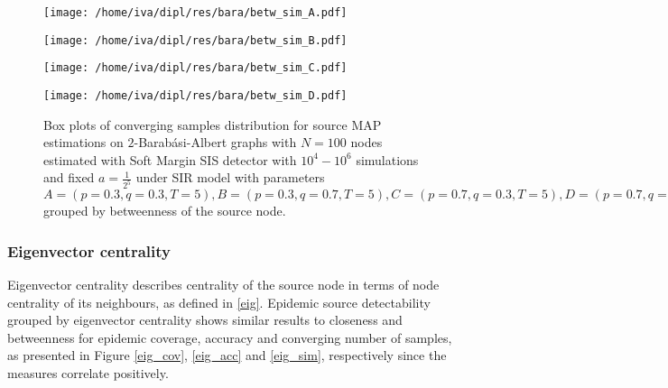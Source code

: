 \documentclass[times, utf8, diplomski]{fer}
\begin{document}
\begin{figure}[H]
\begin{minipage}{\textwidth}
\begin{minipage}{0.5\textwidth}
\texttt{[image: /home/iva/dipl/res/bara/betw\_sim\_A.pdf]}
\end{minipage}
\begin{minipage}{0.5\textwidth}
\texttt{[image: /home/iva/dipl/res/bara/betw\_sim\_B.pdf]}
\end{minipage}
\begin{minipage}{0.5\textwidth}
\texttt{[image: /home/iva/dipl/res/bara/betw\_sim\_C.pdf]}
\end{minipage}
\begin{minipage}{0.5\textwidth}
\texttt{[image: /home/iva/dipl/res/bara/betw\_sim\_D.pdf]}
\end{minipage}
\caption{Box plots of converging samples distribution for source MAP estimations on  $2$-Barab\'{a}si-Albert graphs  with $N=100$ nodes estimated with Soft Margin SIS detector with $10^4 - 10^6$ simulations and fixed $a = \frac{1}{2^5}$ under SIR model with parameters $A = (p=0.3, q=0.3, T=5), B = (p=0.3, q=0.7, T=5), C = (p=0.7, q=0.3, T=5), D = (p=0.7, q=0.7, T=5)$ grouped by betweenness of the source node.}
\label{bara_sim_betw}
\end{minipage}
\end{figure}

\subsubsection{Eigenvector centrality}

Eigenvector centrality describes  centrality of the source node in terms of node centrality of its neighbours, as defined in \ref{eig}. Epidemic source detectability grouped by eigenvector centrality shows similar results to closeness and betweenness for epidemic coverage, accuracy and  converging number of samples, as presented in Figure \ref{eig_cov}, \ref{eig_acc} and \ref{eig_sim}, respectively since the measures correlate positively.
\end{document}
